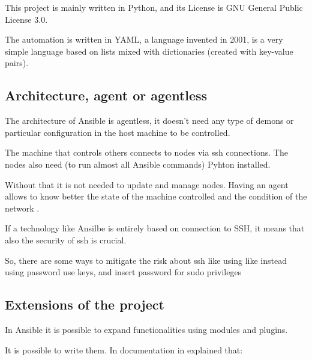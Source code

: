\documentclass[12pt,a4paper,openright,twoside]{book}
\begin{document}
This project is mainly written in Python, and its License is GNU General Public License 3.0.


The automation is written in YAML, a language invented in 2001, is a very simple language based on lists mixed with dictionaries (created with key-value pairs).

\subsection{Architecture, agent or agentless}


The architecture of Ansible is agentless, it doesn't need any type of demons or particular configuration in the host machine to be controlled.


The machine that controls others connects to nodes via ssh connections. The nodes also need (to run almost all Ansible commands) Pyhton installed.


Without that it is not needed to update and manage nodes. Having an agent allows to know better the state of the machine controlled and the condition of the network .


If a technology like Ansilbe is entirely based on connection to SSH, it means that also the security of ssh is crucial.


So, there are some ways to mitigate the risk about ssh like using like instead using password use keys, and insert password for sudo privileges\cite{ansibleSSH}


\subsection{Extensions of the project}
In Ansible it is possible to expand functionalities using modules and plugins.


It is possible to write them. In documentation in explained that:
\end{document}
